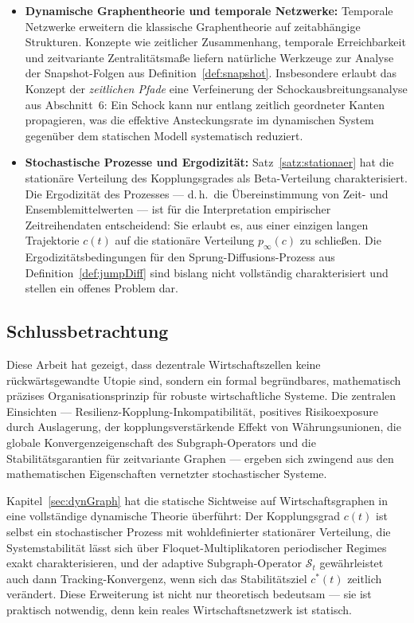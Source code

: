 ﻿\documentclass[a4paper,12pt]{article}
\theoremstyle{definition}
\begin{document}
\begin{itemize}
    \item \textbf{Dynamische Graphentheorie und temporale Netzwerke:}
          Temporale Netzwerke \citep{holme2012temporal} erweitern die klassische
          Graphentheorie auf zeitabhängige Strukturen. Konzepte wie zeitlicher
          Zusammenhang, temporale Erreichbarkeit und zeitvariante Zentralitätsmaße
          liefern natürliche Werkzeuge zur Analyse der Snapshot-Folgen aus
          Definition~\ref{def:snapshot}. Insbesondere erlaubt das Konzept der
          \emph{zeitlichen Pfade} eine Verfeinerung der Schockausbreitungsanalyse
          aus Abschnitt~6: Ein Schock kann nur entlang zeitlich geordneter Kanten
          propagieren, was die effektive Ansteckungsrate im dynamischen System
          gegenüber dem statischen Modell systematisch reduziert.

    \item \textbf{Stochastische Prozesse und Ergodizität:}
          Satz~\ref{satz:stationaer} hat die stationäre Verteilung des
          Kopplungsgrades als Beta-Verteilung charakterisiert. Die Ergodizität
          des Prozesses --- d.\,h.\ die Übereinstimmung von Zeit- und
          Ensemblemittelwerten --- ist für die Interpretation empirischer
          Zeitreihendaten entscheidend: Sie erlaubt es, aus einer einzigen
          langen Trajektorie $c(t)$ auf die stationäre Verteilung $p_\infty(c)$
          zu schließen. Die Ergodizitätsbedingungen für den Sprung-Diffusions-Prozess
          aus Definition~\ref{def:jumpDiff} sind bislang nicht vollständig
          charakterisiert und stellen ein offenes Problem dar.
\end{itemize}

\subsection{Schlussbetrachtung}

Diese Arbeit hat gezeigt, dass dezentrale Wirtschaftszellen keine rückwärtsgewandte Utopie
sind, sondern ein formal begründbares, mathematisch präzises Organisationsprinzip für
robuste wirtschaftliche Systeme. Die zentralen Einsichten --- Resilienz-Kopplung-Inkompatibilität,
positives Risikoexposure durch Auslagerung, der kopplungsverstärkende Effekt von
Währungsunionen, die globale Konvergenzeigenschaft des Subgraph-Operators und die
Stabilitätsgarantien für zeitvariante Graphen --- ergeben sich zwingend aus den
mathematischen Eigenschaften vernetzter stochastischer Systeme.

Kapitel~\ref{sec:dynGraph} hat die statische Sichtweise auf Wirtschaftsgraphen in eine
vollständige dynamische Theorie überführt: Der Kopplungsgrad $c(t)$ ist selbst ein
stochastischer Prozess mit wohldefinierter stationärer Verteilung, die Systemstabilität
lässt sich über Floquet-Multiplikatoren periodischer Regimes exakt charakterisieren,
und der adaptive Subgraph-Operator $\mathcal{S}_t$ gewährleistet auch dann Tracking-Konvergenz,
wenn sich das Stabilitätsziel $c^*(t)$ zeitlich verändert. Diese Erweiterung ist nicht nur
theoretisch bedeutsam --- sie ist praktisch notwendig, denn kein reales Wirtschaftsnetzwerk
ist statisch.
\end{document}
